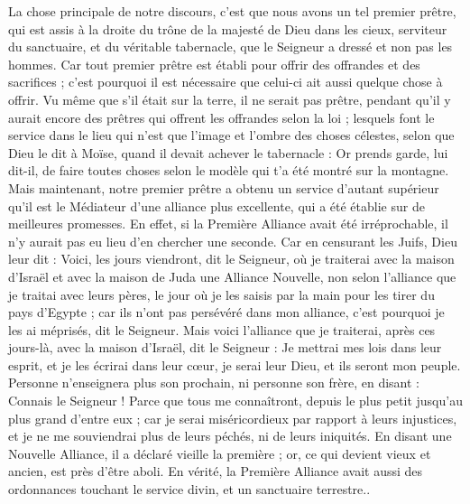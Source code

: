 \begin{multicols}{2}
\VerseOne{}La chose principale de notre discours, c'est que nous avons un tel premier prêtre, qui est assis à la droite du trône de la majesté de Dieu dans les cieux,
serviteur du sanctuaire, et du véritable tabernacle, que le Seigneur a dressé et non pas les hommes.
Car tout premier prêtre est établi pour offrir des offrandes et des sacrifices ; c'est pourquoi il est nécessaire que celui-ci ait aussi quelque chose à offrir.
Vu même que s'il était sur la terre, il ne serait pas prêtre, pendant qu'il y aurait encore des prêtres qui offrent les offrandes selon la loi ;
lesquels font le service dans le lieu qui n'est que l'image et l'ombre des choses célestes, selon que Dieu le dit à Moïse, quand il devait achever le tabernacle : Or prends garde, lui dit-il, de faire toutes choses selon le modèle qui t'a été montré sur la montagne.
Mais maintenant, notre premier prêtre a obtenu un service d'autant supérieur qu'il est le Médiateur d'une alliance plus excellente, qui a été établie sur de meilleures promesses.
En effet, si la Première Alliance avait été irréprochable, il n'y aurait pas eu lieu d'en chercher une seconde.
Car en censurant les Juifs, Dieu leur dit : Voici, les jours viendront, dit le Seigneur, où je traiterai avec la maison d'Israël et avec la maison de Juda une Alliance Nouvelle,
non selon l'alliance que je traitai avec leurs pères, le jour où je les saisis par la main pour les tirer du pays d'Egypte ; car ils n'ont pas persévéré dans mon alliance, c'est pourquoi je les ai méprisés, dit le Seigneur.
Mais voici l'alliance que je traiterai, après ces jours-là, avec la maison d'Israël, dit le Seigneur : Je mettrai mes lois dans leur esprit, et je les écrirai dans leur cœur, je serai leur Dieu, et ils seront mon peuple.
Personne n'enseignera plus son prochain, ni personne son frère, en disant : Connais le Seigneur ! Parce que tous me connaîtront, depuis le plus petit jusqu'au plus grand d'entre eux ;
car je serai miséricordieux par rapport à leurs injustices, et je ne me souviendrai plus de leurs péchés, ni de leurs iniquités.
En disant une Nouvelle Alliance, il a déclaré vieille la première ; or, ce qui devient vieux et ancien, est près d'être aboli.
\VerseOne{}En vérité, la Première Alliance avait aussi des ordonnances touchant le service divin, et un sanctuaire terrestre..

\end{multicols}
